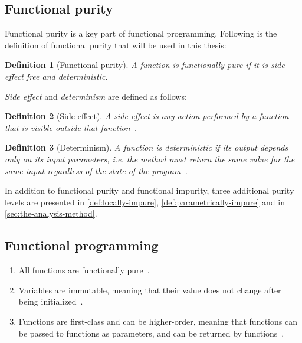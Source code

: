 \documentclass[a4paper,12pt]{article}
\newtheorem{definition}{Definition} %
\begin{document}
\subsection{Functional purity} \label{ssub:functional-purity-definition}

Functional purity is a key part of functional programming. Following is the definition of functional purity that will be used in this thesis:

\begin{definition}[Functional purity] \label{def:functional-purity}
  A function is functionally pure if it is \textit{side effect} free and \textit{deterministic}.
\end{definition}

\textit{Side effect} and \textit{determinism} are defined as follows:

\begin{definition}[Side effect] \label{def:side-effect}
  A side effect is any action performed by a function that is visible outside that function~\cite{purity-in-java}.
\end{definition}

\begin{definition}[Determinism] \label{def:determinism}
  A function is deterministic if its output depends only on its input parameters, i.e. the method must return the same value for the same input regardless of the state of the program~\cite{purity-in-java}.
\end{definition}

In addition to functional purity and functional impurity, three additional purity levels are presented in \autoref{def:locally-impure}, \autoref{def:parametrically-impure} and in \autoref{sec:the-analysis-method}.

\subsection{Functional programming} \label{sub:functional-programming}

\begin{enumerate}
  \item All functions are functionally pure~\cite{alvin-alexander}.
  \item Variables are immutable, meaning that their value does not change after being initialized~\cite{alvin-alexander}. %
  \item Functions are first-class and can be higher-order, meaning that functions can be passed to functions as parameters, and can be returned by functions~\cite{jonas-walter}. %
\end{enumerate}
\end{document}
